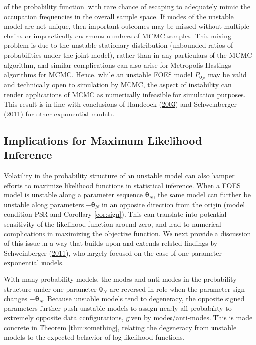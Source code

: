 \documentclass[]{article}
\theoremstyle{definition}
\begin{document}
of the probability function, with rare chance of escaping to adequately
mimic the occupation frequencies in the overall sample space. If modes
of the unstable model are not unique, then important outcomes may be
missed without multiple chains or impractically enormous numbers of MCMC
samples. This mixing problem is due to the unstable stationary
distribution (unbounded ratios of probabilities under the joint model),
rather than in any particulars of the MCMC algorithm, and similar
complications can also arise for Metropolis-Hastings algorithms for
MCMC. Hence, while an unstable FOES model \(P_{\boldsymbol \theta_N}\)
may be valid and technically open to simulation by MCMC, the aspect of
instability can render applications of MCMC as numerically infeasible
for simulation purposes. This result is in line with conclusions of
Handcock (\protect\hyperlink{ref-handcock2003assessing}{2003}) and
Schweinberger
(\protect\hyperlink{ref-schweinberger2011instability}{2011}) for other
exponential models.

\subsection{Implications for Maximum Likelihood
Inference}\label{implications-for-maximum-likelihood-inference}

Volatility in the probability structure of an unstable model can also
hamper efforts to maximize likelihood functions in statistical
inference. When a FOES model is unstable along a parameter sequence
\(\boldsymbol \theta_N\), the same model can further be unstable along
parameters \(-\boldsymbol \theta_N\) in an opposite direction from the
origin (model condition PSR and Corollary \ref{cor:sign}). This can
translate into potential sensitivity of the likelihood function around
zero, and lead to numerical complications in maximizing the objective
function. We next provide a discussion of this issue in a way that
builds upon and extends related findings by Schweinberger
(\protect\hyperlink{ref-schweinberger2011instability}{2011}), who
largely focused on the case of one-parameter exponential models.

With many probability models, the modes and anti-modes in the
probability structure under one parameter \(\boldsymbol \theta_N\) are
reversed in role when the parameter sign changes
\(-\boldsymbol \theta_N\). Because unstable models tend to degeneracy,
the opposite signed parameters further push unstable models to assign
nearly all probability to extremely opposite data configurations, given
by modes/anti-modes. This is made concrete in Theorem
\ref{thm:something}, relating the degeneracy from unstable models to the
expected behavior of log-likelihood functions.
\end{document}
